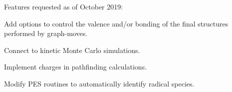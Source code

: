 Features requested as of October 2019\+:


\begin{DoxyItemize}
\item Add options to control the valence and/or bonding of the final structures performed by graph-\/moves.
\item Connect to kinetic Monte Carlo simulations.
\item Implement charges in pathfinding calculations.
\item Modify P\+ES routines to automatically identify radical species. 
\end{DoxyItemize}
